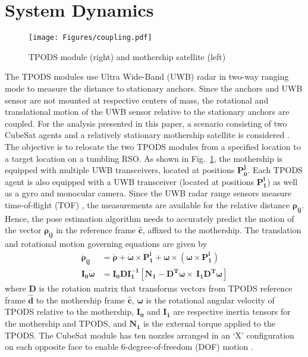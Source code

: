 \section{System Dynamics}

\begin{figure}[!t]
\centerline{\texttt{[image: Figures/coupling.pdf]}}
\caption{TPODS module (right) and mothership satellite (left)}
\label{fig:TPODS_coupling}
\end{figure}

The TPODS modules use Ultra Wide-Band (UWB) radar in two-way ranging mode to measure the distance to stationary anchors. Since the anchors and UWB sensor are not mounted at respective centers of mass, the rotational and translational motion of the UWB sensor relative to the stationary anchors are coupled. For the analysis presented in this paper, a scenario consisting of two CubeSat agents and a relatively stationary mothership satellite is considered \cite{TPODS_GNC24}. The objective is to relocate the two TPODS modules from a specified location to a target location on a tumbling RSO. As shown in Fig.~\ref{fig:TPODS_coupling}, the mothership is equipped with multiple UWB transceivers, located at positions $\boldsymbol{P_0^j}$. Each TPODS agent is also equipped with a UWB transceiver (located at positions $\boldsymbol{P_1^i}$) as well as a gyro and monocular camera. Since the UWB radar range sensors measure time-of-flight (TOF) \cite{OG_fusion}, the measurements are available for the relative distance $\boldsymbol{\rho_{ij}}$. Hence, the pose estimation algorithm needs to accurately predict the motion of the vector $\boldsymbol{\rho_{ij}}$ in the reference frame $\boldsymbol{\hat{c}}$, affixed to the mothership. The translation and rotational motion governing equations \cite{ALFRIEND2010227} are given by 
\begin{align}
\boldsymbol{\ddot{\rho}_{ij}} &= \boldsymbol{\ddot{\rho}}  + \boldsymbol{\dot{\omega}} \times \boldsymbol{P_1^i} + \boldsymbol{\omega} \times \left(\boldsymbol{\omega} \times \boldsymbol{P_1^i}\right)  \label{eqn:coupled_EOM} \\
\boldsymbol{I_0 \dot{\omega}} &= \boldsymbol{I_0 D I_1^{-1}} \left[ \boldsymbol{N_1-D^T \omega} \times\ \boldsymbol{I_1 D^T \omega} \right]   \label{eqn:coupled_EOM_att}
\end{align}
where $\boldsymbol{D}$ is the rotation matrix that transforms vectors from TPODS reference frame $\boldsymbol{\hat{d}}$ to the mothership frame $\boldsymbol{\hat{c}}$, $\boldsymbol{\omega}$ is the rotational angular velocity of TPODS relative to the mothership, $\boldsymbol{I_0}$ and $\boldsymbol{I_1}$ are respective inertia tensors for the mothership and TPODS, and $\boldsymbol{N_1}$ is the external torque applied to the TPODS. The CubeSat module has ten nozzles arranged in an `X' configuration on each opposite face to enable 6-degree-of-freedom (DOF) motion \cite{TPODS_GNC24}.